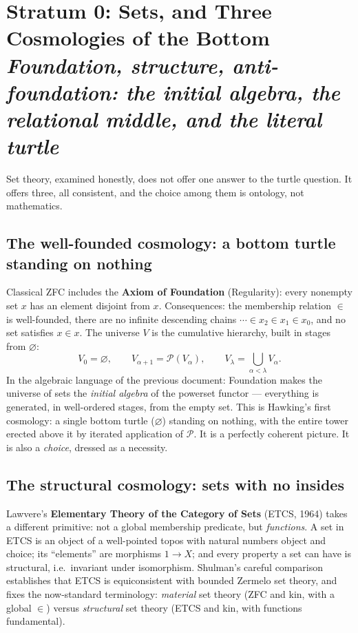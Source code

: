 \documentclass[11pt]{article}
\theoremstyle{plain}
\theoremstyle{definition}
\theoremstyle{remark}
\newcommand{\pow}{\mathcal{P}}
\newcommand{\stratum}[2]{\section{#1 \\ {\normalsize\normalfont\itshape #2}}}
\begin{document}
\stratum{Stratum 0: Sets, and Three Cosmologies of the Bottom}{Foundation, structure, anti-foundation: the initial algebra, the relational middle, and the literal turtle}

Set theory, examined honestly, does not offer one answer to the turtle question. It offers three, all consistent, and the choice among them is ontology, not mathematics.

\subsection{The well-founded cosmology: a bottom turtle standing on nothing}

Classical ZFC includes the \textbf{Axiom of Foundation} (Regularity): every nonempty set $x$ has an element disjoint from $x$. Consequences: the membership relation $\in$ is well-founded, there are no infinite descending chains $\cdots \in x_2 \in x_1 \in x_0$, and no set satisfies $x \in x$. The universe $V$ is the cumulative hierarchy, built in stages from $\varnothing$:
\[
V_0 = \varnothing, \qquad V_{\alpha+1} = \pow(V_\alpha), \qquad V_\lambda = \bigcup_{\alpha<\lambda} V_\alpha .
\]
In the algebraic language of the previous document: Foundation makes the universe of sets the \emph{initial algebra} of the powerset functor --- everything is generated, in well-ordered stages, from the empty set. This is Hawking's first cosmology: a single bottom turtle ($\varnothing$) standing on nothing, with the entire tower erected above it by iterated application of $\pow$. It is a perfectly coherent picture. It is also a \emph{choice}, dressed as a necessity.

\subsection{The structural cosmology: sets with no insides}

Lawvere's \textbf{Elementary Theory of the Category of Sets} (ETCS, 1964) takes a different primitive: not a global membership predicate, but \emph{functions}. A set in ETCS is an object of a well-pointed topos with natural numbers object and choice; its ``elements'' are morphisms $1 \to X$; and every property a set can have is structural, i.e.\ invariant under isomorphism. Shulman's careful comparison establishes that ETCS is equiconsistent with bounded Zermelo set theory, and fixes the now-standard terminology: \emph{material} set theory (ZFC and kin, with a global $\in$) versus \emph{structural} set theory (ETCS and kin, with functions fundamental).
\end{document}
